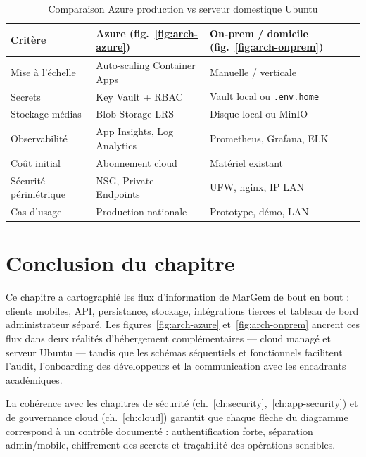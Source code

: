 \begin{table}[H]
  \centering
  \caption{Comparaison Azure production vs serveur domestique Ubuntu}
  \label{tab:compare-deploy}
  \begin{tabularx}{\textwidth}{@{}lXX@{}}
    \toprule
    \textbf{Critère} & \textbf{Azure (fig.~\ref{fig:arch-azure})} & \textbf{On-prem / domicile (fig.~\ref{fig:arch-onprem})} \\
    \midrule
    Mise à l'échelle & Auto-scaling Container Apps & Manuelle / verticale \\
    Secrets & Key Vault + RBAC & Vault local ou \texttt{.env.home} \\
    Stockage médias & Blob Storage LRS & Disque local ou MinIO \\
    Observabilité & App Insights, Log Analytics & Prometheus, Grafana, ELK \\
    Coût initial & Abonnement cloud & Matériel existant \\
    Sécurité périmétrique & NSG, Private Endpoints & UFW, nginx, IP LAN \\
    Cas d'usage & Production nationale & Prototype, démo, LAN \\
    \bottomrule
  \end{tabularx}
\end{table}

\section{Conclusion du chapitre}

Ce chapitre a cartographié les flux d'information de MarGem de bout en bout : clients mobiles, API, persistance, stockage, intégrations tierces et tableau de bord administrateur séparé. Les figures~\ref{fig:arch-azure} et~\ref{fig:arch-onprem} ancrent ces flux dans deux réalités d'hébergement complémentaires --- cloud managé et serveur Ubuntu --- tandis que les schémas séquentiels et fonctionnels facilitent l'audit, l'onboarding des développeurs et la communication avec les encadrants académiques.

La cohérence avec les chapitres de sécurité (ch.~\ref{ch:security},~\ref{ch:app-security}) et de gouvernance cloud (ch.~\ref{ch:cloud}) garantit que chaque flèche du diagramme correspond à un contrôle documenté : authentification forte, séparation admin/mobile, chiffrement des secrets et traçabilité des opérations sensibles.
